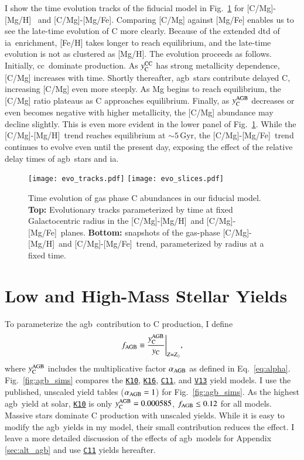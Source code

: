 \documentclass[12pt,oneside,letterpaper]{report}
\newcommand{\cc}{\gls{cc}}
\newcommand{\agb}{\gls{agb}}
\newcommand{\ia}{\gls{ia}}
\newcommand{\cxi}{\texttt{\hyperlink{C11}{C11}}}
\newcommand{\kx}{\texttt{\hyperlink{K10}{K10}}}
\newcommand{\kxvi}{\texttt{\hyperlink{K16}{K16}}}
\newcommand{\vxiii}{\texttt{\hyperlink{V13}{V13}}}
\newcommand{\caah}{[C/Mg]-[Mg/H]}
\newcommand{\caafe}{[C/Mg]-[Mg/Fe]}
\newcommand{\Ycc}{\ensuremath{y_{\rm C}^{\rm CC}}}
\newcommand{\Ycagb}{\ensuremath{y_{\rm C}^{\rm AGB}}}
\newcommand{\Yct}{\ensuremath{y_{\rm C}}}
\newcommand{\about}[1]{${\sim} #1$}
\begin{document}
I show the time evolution tracks of the fiducial model in Fig.~\ref{fig:c_evo} for \caah~ and \caafe. Comparing [C/Mg] against [Mg/Fe] enables us to see the late-time evolution of C more clearly. Because of the extended \gls{dtd} of \ia\ enrichment, [Fe/H] takes longer to reach equilibrium, and the late-time evolution is not as clustered as [Mg/H].
The evolution proceeds as follows.
Initially, \cc\ dominate production. As $\Ycc$ has strong metallicity dependence, [C/Mg] increases with time. Shortly thereafter, \agb\ stars contribute delayed C, increasing [C/Mg] even more steeply. As Mg begins to reach equilibrium, the [C/Mg] ratio plateaus as C approaches equilibrium. Finally, as $\Ycagb$ decreases or even becomes negative with higher metallicity, the [C/Mg] abundance may decline slightly. 
This is even more evident in the lower panel of Fig.~\ref{fig:c_evo}. While the \caah\ trend reaches equilibrium at \about{5}\,Gyr, the \caafe\ trend continues to evolve even until the present day, exposing the effect of the relative delay times of \agb\ stars and \ia.


\begin{figure}[htp]
\centering
\texttt{[image: evo\_tracks.pdf]}
\texttt{[image: evo\_slices.pdf]}
\caption[Carbon Chemical Evolution Tracks]{
    Time evolution of gas phase C abundances in our fiducial model.
    {\bf Top:} Evolutionary tracks parameterized by time at fixed Galactocentric radius in the \caah\ and \caafe\ planes. 
    {\bf Bottom:} snapshots of the gas-phase \caah\ and \caafe\ trend, parameterized by radius at a fixed time.
}
\label{fig:c_evo}
\end{figure}

\section{Low and High-Mass Stellar Yields}\label{sec:f-z-models}

To parameterize the \agb\ contribution to C production, I define 
\begin{equation}\label{eq:f_agb}
    f_{\rm AGB} \equiv \frac{\Ycagb}{\Yct}\Bigg\vert_{Z=Z_\odot},
\end{equation}
where  $\Ycagb$ includes the multiplicative factor $\alpha_{\rm AGB}$ as defined in Eq.~\ref{eq:alpha}.
Fig.~\ref{fig:agb_sims} compares the \kx{}, \kxvi{}, \cxi{}, and \vxiii{} yield models. I use the published, unscaled yield tables ($\alpha_{\rm AGB}=1$) for Fig.~\ref{fig:agb_sims}. As the highest \agb\ yield at solar, \kx{} is only $\Ycagb=0.000585$, $f_{\rm AGB} \leq 0.12$ for all models. Massive stars dominate C production with unscaled yields.  While it is easy to modify the \agb\ yields in my model, their small contribution reduces the effect. I leave a more detailed discussion of the effects of \agb\ models for Appendix \ref{sec:alt_agb} and use \cxi{} yields hereafter.
\end{document}
